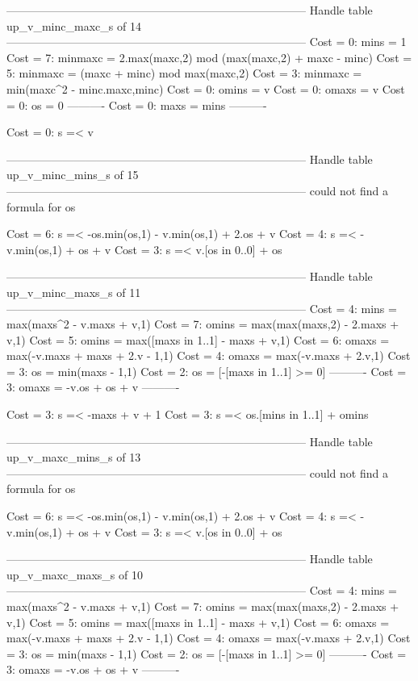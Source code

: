 --------------------------------------------------------------------------------
Handle table up_v_minc_maxc_s of 14
--------------------------------------------------------------------------------
Cost =  0:  mins    = 1
Cost =  7:  minmaxc = 2.max(maxc,2) mod (max(maxc,2) + maxc - minc)
Cost =  5:  minmaxc = (maxc + minc) mod max(maxc,2)
Cost =  3:  minmaxc = min(maxc^2 - minc.maxc,minc)
Cost =  0:  omins   = v
Cost =  0:  omaxs   = v
Cost =  0:  os      = 0
----------
Cost =  0:  maxs    = mins
----------

Cost =  0:  s =< v

--------------------------------------------------------------------------------
Handle table up_v_minc_mins_s of 15
--------------------------------------------------------------------------------
could not find a formula for os

Cost =  6:  s =< -os.min(os,1) - v.min(os,1) + 2.os + v
Cost =  4:  s =< -v.min(os,1) + os + v
Cost =  3:  s =< v.[os in 0..0] + os

--------------------------------------------------------------------------------
Handle table up_v_minc_maxs_s of 11
--------------------------------------------------------------------------------
Cost =  4:  mins  = max(maxs^2 - v.maxs + v,1)
Cost =  7:  omins = max(max(maxs,2) - 2.maxs + v,1)
Cost =  5:  omins = max([maxs in 1..1] - maxs + v,1)
Cost =  6:  omaxs = max(-v.maxs + maxs + 2.v - 1,1)
Cost =  4:  omaxs = max(-v.maxs + 2.v,1)
Cost =  3:  os    = min(maxs - 1,1)
Cost =  2:  os    = [-[maxs in 1..1] >= 0]
----------
Cost =  3:  omaxs = -v.os + os + v
----------

Cost =  3:  s =< -maxs + v + 1
Cost =  3:  s =< os.[mins in 1..1] + omins

--------------------------------------------------------------------------------
Handle table up_v_maxc_mins_s of 13
--------------------------------------------------------------------------------
could not find a formula for os

Cost =  6:  s =< -os.min(os,1) - v.min(os,1) + 2.os + v
Cost =  4:  s =< -v.min(os,1) + os + v
Cost =  3:  s =< v.[os in 0..0] + os

--------------------------------------------------------------------------------
Handle table up_v_maxc_maxs_s of 10
--------------------------------------------------------------------------------
Cost =  4:  mins  = max(maxs^2 - v.maxs + v,1)
Cost =  7:  omins = max(max(maxs,2) - 2.maxs + v,1)
Cost =  5:  omins = max([maxs in 1..1] - maxs + v,1)
Cost =  6:  omaxs = max(-v.maxs + maxs + 2.v - 1,1)
Cost =  4:  omaxs = max(-v.maxs + 2.v,1)
Cost =  3:  os    = min(maxs - 1,1)
Cost =  2:  os    = [-[maxs in 1..1] >= 0]
----------
Cost =  3:  omaxs = -v.os + os + v
----------

